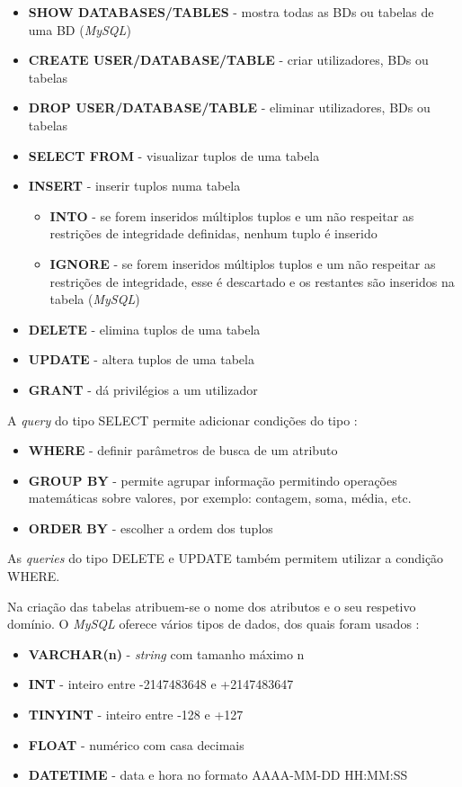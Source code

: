\documentclass[11pt,twoside,a4paper]{report}
\begin{document}
\begin{itemize}
	\item \textbf{SHOW DATABASES/TABLES} - mostra todas as BDs ou tabelas de uma BD (\textit{MySQL})
	\item \textbf{CREATE USER/DATABASE/TABLE} - criar utilizadores, BDs ou tabelas
	\item \textbf{DROP USER/DATABASE/TABLE} - eliminar utilizadores, BDs ou tabelas
	\item \textbf{SELECT FROM} - visualizar tuplos de uma tabela
	\item \textbf{INSERT} - inserir tuplos numa tabela
	\begin{itemize}
		\item \textbf{INTO} - se forem inseridos múltiplos tuplos e um não respeitar as restrições de integridade definidas, nenhum tuplo é inserido
		\item \textbf{IGNORE} - se forem inseridos múltiplos tuplos e um não respeitar as restrições de integridade, esse é descartado e os restantes são inseridos na tabela (\textit{MySQL})
	\end{itemize}
	\item \textbf{DELETE} - elimina tuplos de uma tabela
	\item \textbf{UPDATE} - altera tuplos de uma tabela
	\item \textbf{GRANT} - dá privilégios a um utilizador
\end{itemize}
A \textit{query} do tipo SELECT permite adicionar condições do tipo \cite{mysql}:
\begin{itemize}
	\item \textbf{WHERE} - definir parâmetros de busca de um atributo
	\item \textbf{GROUP BY} - permite agrupar informação permitindo operações matemáticas sobre valores, por exemplo: contagem, soma, média, etc.
	\item \textbf{ORDER BY} - escolher a ordem dos tuplos
\end{itemize}
As \textit{queries} do tipo DELETE e UPDATE  também permitem utilizar a condição WHERE.\par 
Na criação das tabelas atribuem-se o nome dos atributos e o seu respetivo domínio. O \textit{MySQL} oferece vários tipos de dados, dos quais foram usados \cite{mysql}:
\begin{itemize}
	\item \textbf{VARCHAR(n)} - \textit{string} com tamanho máximo n
	\item \textbf{INT} - inteiro entre -2147483648 e +2147483647
	\item \textbf{TINYINT} - inteiro entre -128 e +127
	\item \textbf{FLOAT} - numérico com casa decimais
	\item \textbf{DATETIME} - data e hora no formato AAAA-MM-DD HH:MM:SS
\end{itemize}
\end{document}

